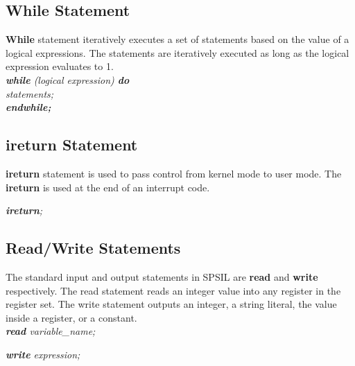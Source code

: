 \documentclass[11pt]{article}
\begin{document}
\subsection{While Statement}
\textbf{While} statement iteratively executes a set of statements based on the value of a logical expressions.  The statements are iteratively executed as long as the logical expression evaluates to 1.\\

\textit{
\textbf{while} (logical expression) \textbf{do}  \\
 \indent \indent statements; \\
\indent \textbf{endwhile;}  \\
}


\subsection{ireturn Statement}
\textbf{ireturn} statement is used to pass control from kernel mode to user mode. The \textbf{ireturn} is used at the end of an interrupt code.

\textit{\textbf{ireturn};}


\subsection{Read/Write Statements}
The standard input and output statements in SPSIL are \textbf{read} and \textbf{write} respectively. The read statement reads an integer value into any register in the register set. The write statement outputs an integer, a string literal, the value inside a register, or a constant.\\

\textit{\textbf{read} variable\_name;}

\textit{\textbf{write} expression;}
\end{document}
